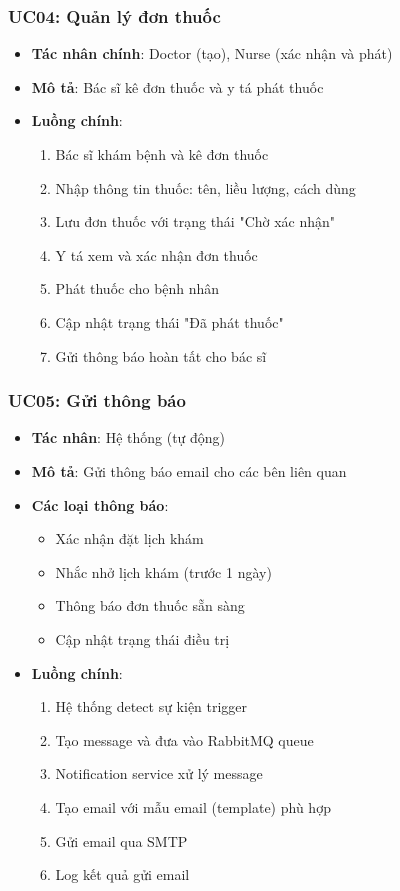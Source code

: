 \documentclass[12pt,a4paper]{report}
\begin{document}
\subsubsection{UC04: Quản lý đơn thuốc}
\begin{itemize}
    \item \textbf{Tác nhân chính}: Doctor (tạo), Nurse (xác nhận và phát)
    \item \textbf{Mô tả}: Bác sĩ kê đơn thuốc và y tá phát thuốc
    \item \textbf{Luồng chính}:
    \begin{enumerate}
        \item Bác sĩ khám bệnh và kê đơn thuốc
        \item Nhập thông tin thuốc: tên, liều lượng, cách dùng
        \item Lưu đơn thuốc với trạng thái "Chờ xác nhận"
        \item Y tá xem và xác nhận đơn thuốc
        \item Phát thuốc cho bệnh nhân
        \item Cập nhật trạng thái "Đã phát thuốc"
        \item Gửi thông báo hoàn tất cho bác sĩ
    \end{enumerate}
\end{itemize}

\subsubsection{UC05: Gửi thông báo}
\begin{itemize}
    \item \textbf{Tác nhân}: Hệ thống (tự động)
    \item \textbf{Mô tả}: Gửi thông báo email cho các bên liên quan
    \item \textbf{Các loại thông báo}:
    \begin{itemize}
        \item Xác nhận đặt lịch khám
        \item Nhắc nhở lịch khám (trước 1 ngày)
        \item Thông báo đơn thuốc sẵn sàng
        \item Cập nhật trạng thái điều trị
    \end{itemize}
    \item \textbf{Luồng chính}:
    \begin{enumerate}
        \item Hệ thống detect sự kiện trigger
        \item Tạo message và đưa vào RabbitMQ queue
        \item Notification service xử lý message
        \item Tạo email với mẫu email (template) phù hợp
        \item Gửi email qua SMTP
        \item Log kết quả gửi email
    \end{enumerate}
\end{itemize}
\end{document}

